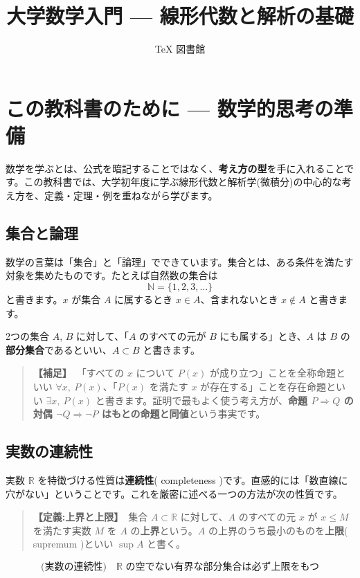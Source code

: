 \documentclass{article}
\title{大学数学入門 — 線形代数と解析の基礎}
\author{TeX 図書館}
\begin{document}
\section{この教科書のために — 数学的思考の準備}

数学を学ぶとは、公式を暗記することではなく、\textbf{考え方の型}を手に入れることです。この教科書では、大学初年度に学ぶ線形代数と解析学(微積分)の中心的な考え方を、定義・定理・例を重ねながら学びます。

\subsection{集合と論理}

数学の言葉は「集合」と「論理」でできています。集合とは、ある条件を満たす対象を集めたものです。たとえば自然数の集合は
\[ \mathbb{N} = \{1, 2, 3, \dots\} \]
と書きます。\(x\) が集合 \(A\) に属するとき \(x \in A\)、含まれないとき \(x \notin A\) と書きます。

2つの集合 \(A\), \(B\) に対して、「\(A\) のすべての元が \(B\) にも属する」とき、\(A\) は \(B\) の\textbf{部分集合}であるといい、\(A \subset B\) と書きます。

\begin{quote}
\textbf{【補足】}\ 「すべての \(x\) について \(P(x)\) が成り立つ」ことを全称命題といい \(\forall x,\ P(x)\)、「\(P(x)\) を満たす \(x\) が存在する」ことを存在命題といい \(\exists x,\ P(x)\) と書きます。証明で最もよく使う考え方が、\textbf{命題 \(P \Rightarrow Q\) の対偶 \(\lnot Q \Rightarrow \lnot P\) はもとの命題と同値}という事実です。
\end{quote}

\subsection{実数の連続性}

実数 \(\mathbb{R}\) を特徴づける性質は\textbf{連続性}( completeness )です。直感的には「数直線に穴がない」ということです。これを厳密に述べる一つの方法が次の性質です。

\begin{quote}
\textbf{【定義:上界と上限】}\ 集合 \(A \subset \mathbb{R}\) に対して、\(A\) のすべての元 \(x\) が \(x \le M\) を満たす実数 \(M\) を \(A\) の\textbf{上界}という。\(A\) の上界のうち最小のものを\textbf{上限}( supremum )といい \(\sup A\) と書く。
\end{quote}

\[ \text{(実数の連続性)} \quad \mathbb{R}\text{ の空でない有界な部分集合は必ず上限をもつ} \]
\end{document}
